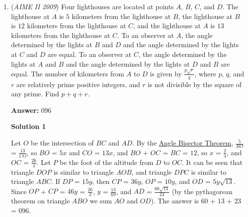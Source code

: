\begin{enumerate}
 Since $y'=y-3$, in order for $y'$ to be non-positive $1 \leq y \leq 3$. However, equation (1) requires y to be odd, so we have two cases to consider: $y=1$ and $y=3$. This results in the two equations $4x+3+2z=2009$ and $4x+9+2z=2009$.

 $4x+3+2z=2009$ simplifies to $2x+z=1003$. There is exactly one valid $z$ for each $x$; $x$ must be between $1$ and $501$ (inclusive) to obtain positive integer solutions. Therefore, there are $501$ solutions in this case. 

 $4x+9+2z=2009$ simplifies to $2x+z=1000$. There is exactly one valid $z$ for each $x$; $x$ must be between $1$ and $499$ (inclusive) to obtain positive integer solutions. Therefore, there are $499$ solutions in this case. 

 Thus, $m-n = 501 + 499 = 1000; 1000 \equiv \boxed{000} \pmod{1000}$.

 


	\item (\textit{AIME II 2009}) Four lighthouses are located at points $A$, $B$, $C$, and $D$. The lighthouse at $A$ is $5$ kilometers from the lighthouse at $B$, the lighthouse at $B$ is $12$ kilometers from the lighthouse at $C$, and the lighthouse at $A$ is $13$ kilometers from the lighthouse at $C$. To an observer at $A$, the angle determined by the lights at $B$ and $D$ and the angle determined by the lights at $C$ and $D$ are equal. To an observer at $C$, the angle determined by the lights at $A$ and $B$ and the angle determined by the lights at $D$ and $B$ are equal. The number of kilometers from $A$ to $D$ is given by $\frac{p\sqrt{r}}{q}$, where $p$, $q$, and $r$ are relatively prime positive integers, and $r$ is not divisible by the square of any prime. Find $p+q+r$.


 
 \textbf{Answer: }096



\textbf{Solution 1}

Let $O$ be the intersection of $BC$ and $AD$. By the \href{https://artofproblemsolving.com/wiki/index.php?title=Angle\_Bisector\_Theorem}{Angle Bisector Theorem}, $\frac {5}{BO}$ = $\frac {13}{CO}$, so $BO$ = $5x$ and $CO$ = $13x$, and $BO$ + $OC$ = $BC$ = $12$, so $x$ = $\frac {2}{3}$, and $OC$ = $\frac {26}{3}$. Let $P$ be the foot of the altitude from $D$ to $OC$. It can be seen that triangle $DOP$ is similar to triangle $AOB$, and triangle $DPC$ is similar to triangle $ABC$. If $DP$ = $15y$, then $CP$ = $36y$, $OP$ = $10y$, and $OD$ = $5y\sqrt {13}$. Since $OP$ + $CP$ = $46y$ = $\frac {26}{3}$, $y$ = $\frac {13}{69}$, and $AD$ = $\frac {60\sqrt{13}}{23}$ (by the pythagorean theorem on triangle $ABO$ we sum $AO$ and $OD$). The answer is $60$ + $13$ + $23$ = $\boxed{096}$.


\end{enumerate}

